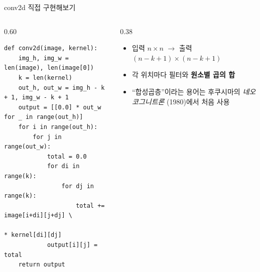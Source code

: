 \documentclass[aspectratio=169,11pt]{beamer}
\begin{document}

\begin{frame}[fragile]{conv2d 직접 구현해보기}
  \begin{columns}[T]
    \begin{column}{0.60\textwidth}
\begin{lstlisting}
def conv2d(image, kernel):
    img_h, img_w = len(image), len(image[0])
    k = len(kernel)
    out_h, out_w = img_h - k + 1, img_w - k + 1
    output = [[0.0] * out_w for _ in range(out_h)]
    for i in range(out_h):
        for j in range(out_w):
            total = 0.0
            for di in range(k):
                for dj in range(k):
                    total += image[i+di][j+dj] \
                             * kernel[di][dj]
            output[i][j] = total
    return output
\end{lstlisting}
    \end{column}
    \begin{column}{0.38\textwidth}
      \begin{itemize}
        \item 입력 $n\times n$ $\to$ 출력
          $(n-k+1)\times(n-k+1)$
        \item 각 위치마다 필터와
          \textbf{원소별 곱의 합}
        \item ``합성곱층''이라는 용어는
          후쿠시마의 \textit{네오코그니트론}
          (1980)에서 처음 사용
      \end{itemize}
    \end{column}
  \end{columns}
\end{frame}
\end{document}
